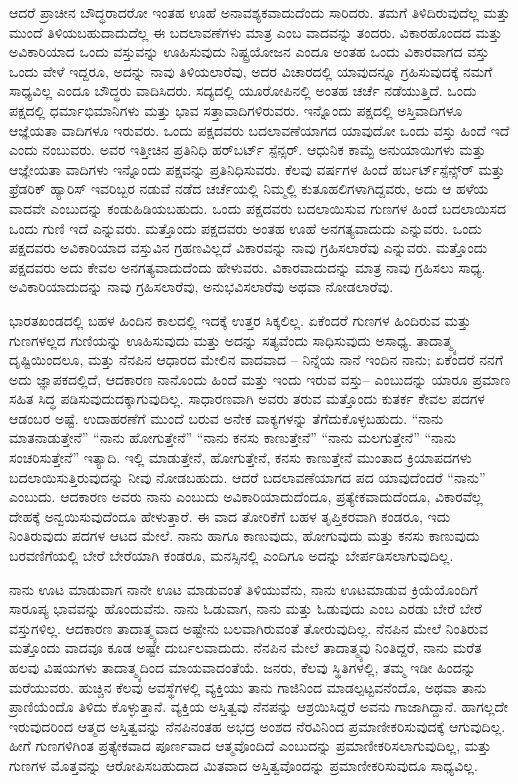 ಆದರೆ ಪ್ರಾಚೀನ ಬೌದ್ಧರಾದರೋ ಇಂತಹ ಊಹೆ ಅನಾವಶ್ಯಕವಾದುದೆಂದು ಸಾರಿದರು. ತಮಗೆ ತಿಳಿದಿರುವುದೆಲ್ಲ ಮತ್ತು ಮುಂದೆ ತಿಳಿಯಬಹುದಾದುದೆಲ್ಲ ಈ ಬದಲಾವಣೆಗಳು ಮಾತ್ರ ಎಂಬ ವಾದವನ್ನು ತಂದರು. ವಿಕಾರಹೊಂದದ ಮತ್ತು ಅವಿಕಾರಿಯಾದ ಒಂದು ವಸ್ತುವನ್ನು ಊಹಿಸುವುದು ನಿಷ್ಟ್ರಯೋಜನ ಎಂದೂ ಅಂತಹ ಒಂದು ವಿಕಾರವಾಗದ ವಸ್ತು ಒಂದು ವೇಳೆ ಇದ್ದರೂ, ಅದನ್ನು ನಾವು ತಿಳಿಯಲಾರೆವು, ಅದರ ವಿಚಾರದಲ್ಲಿ ಯಾವುದನ್ನೂ ಗ್ರಹಿಸುವುದಕ್ಕೆ ನಮಗೆ ಸಾಧ್ಯವಿಲ್ಲ ಎಂದೂ ಬೌದ್ಧರು ವಾದಿಸಿದರು. ಸದ್ಯದಲ್ಲಿ ಯೂರೋಪಿನಲ್ಲಿ ಅಂತಹ ಚರ್ಚೆ ನಡೆಯುತ್ತಿದೆ. ಒಂದು ಪಕ್ಷದಲ್ಲಿ ಧರ್ಮಾಭಿಮಾನಿಗಳು ಮತ್ತು ಭಾವ ಸತ್ತಾವಾದಿಗಳಿರುವರು. ಇನ್ನೊಂದು ಪಕ್ಷದಲ್ಲಿ ಅಸ್ತಿವಾದಿಗಳೂ ಆಜ್ಞೆಯತಾ ವಾದಿಗಳೂ ಇರುವರು. ಒಂದು ಪಕ್ಷದವರು ಬದಲಾವಣೆಯಾಗದ ಯಾವುದೋ ಒಂದು ವಸ್ತು ಹಿಂದೆ ಇದೆ ಎಂದು ನಂಬುವರು. ಅವರ ಇತ್ತೀಚಿನ ಪ್ರತಿನಿಧಿ ಹರ್​ಬರ್ಟ್​ ಸ್ಪೆನ್ಸರ್​. ಆಧುನಿಕ ಕಾಮ್ಟೆ ಅನುಯಾಯಿಗಳು ಮತ್ತು ಆಜ್ಞೇಯತಾ ವಾದಿಗಳು ಇನ್ನೊಂದು ಪಕ್ಷವನ್ನು ಪ್ರತಿನಿಧಿಸುವರು. ಕೆಲವು ವರ್ಷಗಳ ಹಿಂದೆ ಹರ್ಬರ್ಟ್​ ಸ್ಪೆನ್ಸ್​ರ್​ ಮತ್ತು ಫ್ರೆಡರಿಕ್​ ಹ್ಯಾರಿಸ್​ ಇವರಿಬ್ಬರ ನಡುವೆ ನಡೆದ ಚರ್ಚೆಯಲ್ಲಿ ನಿಮ್ಮಲ್ಲಿ ಕುತೂಹಲಿಗಳಾಗಿದ್ದವರು, ಅದು ಆ ಹಳೆಯ ವಾದವೇ ಎಂಬುದನ್ನು ಕಂಡುಹಿಡಿಯಬಹುದು. ಒಂದು ಪಕ್ಷದವರು ಬದಲಾಯಿಸುವ ಗುಣಗಳ ಹಿಂದೆ ಬದಲಾಯಿಸದ ಒಂದು ಗುಣಿ ಇದೆ ಎನ್ನುವರು. ಮತ್ತೊಂದು ಪಕ್ಷದವರು ಅಂತಹ ಊಹೆ ಅನಗತ್ಯವಾದುದು ಎನ್ನುವರು. ಒಂದು ಪಕ್ಷದವರು ಅವಿಕಾರಿಯಾದ ವಸ್ತುವಿನ ಗ್ರಹಣವಿಲ್ಲದೆ ವಿಕಾರವನ್ನು ನಾವು ಗ್ರಹಿಸಲಾರೆವು ಎನ್ನುವರು. ಮತ್ತೊಂದು ಪಕ್ಷದವರು ಅದು ಕೇವಲ ಅನಗತ್ಯವಾದುದೆಂದು ಹೇಳುವರು. ವಿಕಾರವಾದುದನ್ನು ಮಾತ್ರ ನಾವು ಗ್ರಹಿಸಲು ಸಾಧ್ಯ. ಅವಿಕಾರಿಯಾದುದನ್ನು ನಾವು ಗ್ರಹಿಸಲಾರೆವು, ಅನುಭವಿಸಲಾರೆವು ಅಥವಾ ನೋಡಲಾರೆವು. 

ಭಾರತಖಂಡದಲ್ಲಿ ಬಹಳ ಹಿಂದಿನ ಕಾಲದಲ್ಲಿ ಇದಕ್ಕೆ ಉತ್ತರ ಸಿಕ್ಕಲಿಲ್ಲ. ಏಕೆಂದರೆ ಗುಣಗಳ ಹಿಂದಿರುವ ಮತ್ತು ಗುಣಗಳಲ್ಲದ ಗುಣಿಯನ್ನು ಊಹಿಸುವುದು ಮತ್ತು ಅದನ್ನು ಸತ್ಯವೆಂದು ಸಾಧಿಸುವುದು ಅಸಾಧ್ಯ. ತಾದಾತ್ಮ್ಯ ದೃಷ್ಟಿಯಿಂದಲೂ, ಮತ್ತು ನೆನಪಿನ ಆಧಾರದ ಮೇಲಿನ ವಾದವಾದ – ನಿನ್ನೆಯ ನಾನೆ ಇಂದಿನ ನಾನು; ಏಕೆಂದರೆ ನನಗೆ ಅದು ಜ್ಞಾಪಕದಲ್ಲಿದೆ, ಆದಕಾರಣ ನಾನೊಂದು ಹಿಂದೆ ಮತ್ತು ಇಂದು ಇರುವ ವಸ್ತು– ಎಂಬುದನ್ನು ಯಾರೂ ಪ್ರಮಾಣ ಸಹಿತ ಸಿದ್ಧ ಪಡಿಸುವುದುದಕ್ಕಾಗುವುದಿಲ್ಲ. ಸಾಧಾರಣವಾಗಿ ಅವರು ತರುವ ಮತ್ತೊಂದು ಕುತರ್ಕ ಕೇವಲ ಪದಗಳ ಆಡಂಬರ ಅಷ್ಟೆ. ಉದಾಹರಣೆಗೆ ಮುಂದೆ ಬರುವ ಅನೇಕ ವಾಕ್ಯಗಳನ್ನು ತೆಗೆದುಕೊಳ್ಳಬಹುದು. “ನಾನು ಮಾತನಾಡುತ್ತೇನೆ” “ನಾನು ಹೋಗುತ್ತೇನೆ” “ನಾನು ಕನಸು ಕಾಣುತ್ತೇನೆ” “ನಾನು ಮಲಗುತ್ತೇನೆ” “ನಾನು ಸಂಚರಿಸುತ್ತೇನೆ” ಇತ್ಯಾದಿ. ಇಲ್ಲಿ ಮಾಡುತ್ತೇನೆ, ಹೋಗುತ್ತೇನೆ, ಕನಸು ಕಾಣುತ್ತೇನೆ ಮುಂತಾದ ಕ್ರಿಯಾಪದಗಳು ಬದಲಾಯಿಸುತ್ತಿರುವುದನ್ನು ನೀವು ನೋಡಬಹುದು. ಆದರೆ ಬದಲಾವಣೆಯಾಗದ ಪದ ಯಾವುದೆಂದರೆ “ನಾನು” ಎಂಬುದು. ಆದಕಾರಣ ಅವರು ನಾನು ಎಂಬುದು ಅವಿಕಾರಿಯಾದುದೆಂದೂ, ಪ್ರತ್ಯೇಕವಾದುದೆಂದೂ, ವಿಕಾರವೆಲ್ಲ ದೇಹಕ್ಕೆ ಅನ್ವಯಿಸುವುದೆಂದೂ ಹೇಳುತ್ತಾರೆ. ಈ ವಾದ ತೋರಿಕೆಗೆ ಬಹಳ ತೃಪ್ತಿಕರವಾಗಿ ಕಂಡರೂ, ಇದು ನಿಂತಿರುವುದು ಪದಗಳ ಆಟದ ಮೇಲೆ. ನಾನು ಹಾಗೂ ಕಾಣುವುದು, ಹೋಗುವುದು ಮತ್ತು ಕನಸು ಕಾಣುವುದು ಬರವಣಿಗೆಯಲ್ಲಿ ಬೇರೆ ಬೇರೆಯಾಗಿ ಕಂಡರೂ, ಮನಸ್ಸಿನಲ್ಲಿ ಎಂದಿಗೂ ಅದನ್ನು ಬೇರ್ಪಡಿಸಲಾಗುವುದಿಲ್ಲ. 

ನಾನು ಊಟ ಮಾಡುವಾಗ ನಾನೇ ಊಟ ಮಾಡುವಂತೆ ತಿಳಿಯುವೆನು, ನಾನು ಊಟಮಾಡುವ ಕ್ರಿಯೆಯೊಂದಿಗೆ ಸಾರೂಪ್ಯ ಭಾವವನ್ನು ಹೊಂದುವೆನು. ನಾನು ಓಡುವಾಗ, ನಾನು ಮತ್ತು ಓಡುವುದು ಎಂಬ ಎರಡು ಬೇರೆ ಬೇರೆ ವಸ್ತುಗಳಿಲ್ಲ. ಆದಕಾರಣ ತಾದಾತ್ಮ್ಯವಾದ ಅಷ್ಟೇನು ಬಲವಾಗಿರುವಂತೆ ತೋರುವುದಿಲ್ಲ. ನೆನಪಿನ ಮೇಲೆ ನಿಂತಿರುವ ಮತ್ತೊಂದು ವಾದವೂ ಕೂಡ ಅಷ್ಟೇ ದುರ್ಬಲವಾದುದು. ನೆನಪಿನ ಮೇಲೆ ತಾದಾತ್ಮ್ಯವು ನಿಂತಿದ್ದರೆ, ನಾನು ಮರೆತ ಹಲವು ವಿಷಯಗಳು ತಾದಾತ್ಮ್ಯದಿಂದ ಮಾಯವಾದಂತೆಯೆ. ಜನರು, ಕೆಲವು ಸ್ಥಿತಿಗಳಲ್ಲಿ, ತಮ್ಮ ಇಡೀ ಹಿಂದನ್ನು ಮರೆಯುವರು. ಹುಚ್ಚಿನ ಕೆಲವು ಅವಸ್ಥೆಗಳಲ್ಲಿ ವ್ಯಕ್ತಿಯು ತಾನು ಗಾಜಿನಿಂದ ಮಾಡಲ್ಪಟ್ಟವನೆಂದೊ, ಅಥವಾ ತಾನು ಪ್ರಾಣಿಯೆಂದೊ ತಿಳಿದು ಕೊಳ್ಳುತ್ತಾನೆ. ವ್ಯಕ್ತಿಯ ಅಸ್ತಿತ್ವವು ನೆನಪನ್ನು ಆಶ್ರಯಿಸಿದ್ದರೆ ಅವನು ಗಾಜಾಗಿದ್ದಾನೆ. ಹಾಗಲ್ಲದೇ ಇರುವುದರಿಂದ ಆತ್ಮದ ಅಸ್ತಿತ್ವವನ್ನು ನೆನಪಿನಂತಹ ಅಭದ್ರ ಅಂಶದ ನೆರವಿನಿಂದ ಪ್ರಮಾಣೀಕರಿಸುವುದಕ್ಕೆ ಆಗುವುದಿಲ್ಲ. ಹೀಗೆ ಗುಣಗಳಿಗಿಂತ ಪ್ರತ್ಯೇಕವಾದ ಪೂರ್ಣವಾದ ಆತ್ಮವೊಂದಿದೆ ಎಂಬುದನ್ನು ಪ್ರಮಾಣೀಕರಿಸಲಾಗುವುದಿಲ್ಲ, ಮತ್ತು ಗುಣಗಳ ಮೊತ್ತವನ್ನು ಆರೋಪಿಸಬಹುದಾದ ಮಿತವಾದ ಅಸ್ತಿತ್ವವೊಂದನ್ನು ಪ್ರಮಾಣೀಕರಿಸುವುದೂ ಸಾಧ್ಯವಿಲ್ಲ. 

